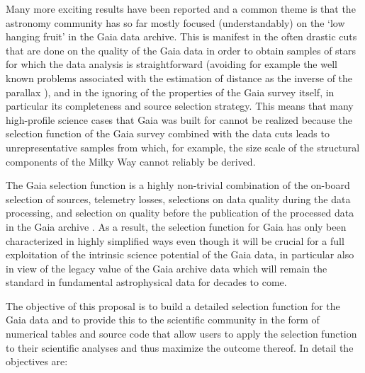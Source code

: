 Many more exciting results have been reported and a common theme is that the astronomy community has so far mostly
focused (understandably) on the `low hanging fruit' in the Gaia data archive. This is manifest in the often drastic cuts
that are done on the quality of the Gaia data in order to obtain samples of stars for which the data analysis is
straightforward (avoiding for example the well known problems associated with the estimation of distance as the inverse
of the parallax \cite{2018A&A...616A...9L}), and in the ignoring of the properties of the Gaia survey itself, in
particular its completeness and source selection strategy. This means that many high-profile science cases that Gaia was
built for cannot be realized because the selection function of the Gaia survey combined with the data cuts leads to
unrepresentative samples from which, for example, the size scale of the structural components of the Milky Way cannot
reliably be derived.

The Gaia selection function is a highly non-trivial combination of the on-board selection of sources, telemetry
losses, selections on data quality during the data processing, and selection on quality before the publication of the
processed data in the Gaia archive . As a result, the
selection function for Gaia has only been characterized in highly simplified ways  even though it will be crucial for a full exploitation of the intrinsic science
potential of the Gaia data, in particular also in view of the legacy value of the Gaia archive data which will remain
the standard in fundamental astrophysical data for decades to come.

The objective of this proposal is to build a detailed selection function for the Gaia data and to provide this to the
scientific community in the form of numerical tables and source code that allow users to apply the selection function to
their scientific analyses and thus maximize the outcome thereof. In detail the objectives are:

